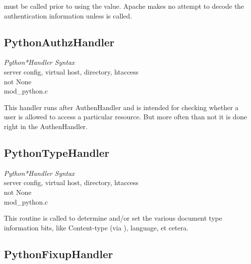 \begin{notice}
   must be called prior to using the
   value. Apache makes no attempt to decode the
  authentication information unless  is called.
\end{notice}

\subsection{PythonAuthzHandler\label{dir-handlers-auzh}}

\emph{Python*Handler Syntax}\\
server config, virtual host, directory, htaccess\\
not None\\
mod_python.c

This handler runs after AuthenHandler and is intended for checking
whether a user is allowed to access a particular resource. But more
often than not it is done right in the AuthenHandler.

\subsection{PythonTypeHandler\label{dir-handlers-tph}}

\emph{Python*Handler Syntax}\\
server config, virtual host, directory, htaccess\\
not None\\
mod_python.c

This routine is called to determine and/or set the various document
type information bits, like Content-type (via ),
language, et cetera.

\subsection{PythonFixupHandler\label{dir-handlers-fuh}}

